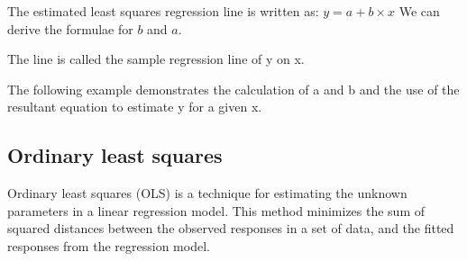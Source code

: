 \documentclass[a4paper,12pt]{article}
\begin{document}
The estimated least squares regression line is written as:
$y = a + b\times x$
We can derive the formulae for $b$ and $a$.



The line is called the sample regression line of y on x.

The following example demonstrates the calculation of a and b and the use of the resultant
equation to estimate y for a given x.

\subsection{Ordinary least squares}
Ordinary least squares (OLS) is a technique for estimating the unknown parameters in a linear regression model. This method minimizes the sum of squared distances between the observed responses in a set of data, and the fitted responses from the regression model.
\end{document}
